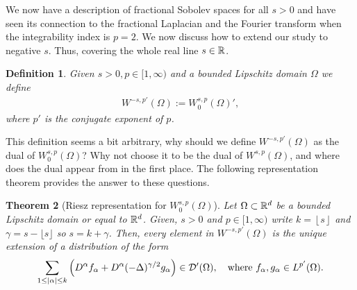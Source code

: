 \documentclass[12pt]{article}
\newtheorem{theorem}{Theorem}[section]
\newtheorem{definition}[theorem]{Definition}
\theoremstyle{definition}
\begin{document}
We now have a description of fractional Sobolev spaces for all $s>0$ and have seen its connection to the fractional Laplacian and the Fourier transform when the integrability index is $p=2$. We now discuss how to extend our study to negative $s$. Thus, covering the whole real line $s \in \mathbb{R}$.

\begin{definition}\label{dual definition}
  Given $s>0, p \in [1,\infty)$ and a bounded Lipschitz domain $\Omega $ we define
  \begin{align*}
    W^{-s,p'}(\Omega ):= W^{s,p}_0(\Omega )',
  \end{align*}
  where $p'$ is the conjugate exponent of $p$.
\end{definition}
This definition seems a bit arbitrary, why should we define $W^{-s,p'}(\Omega )$ as the dual of $W^{s,p}_0(\Omega )$? Why not choose it to be the dual of $W^{s,p}(\Omega )$, and where does the dual appear from in the first place. The following representation theorem provides the answer to these questions.
\begin{theorem}[Riesz representation for $W_0^{s,p}(\Omega )$]\label{riesz representation}
  Let $\Omega \subset \mathbb{R}^d$ be a bounded Lipschitz domain or equal to $\mathbb{R}^d$. Given,  $s>0$ and $p \in [1,\infty)$ write $k=\left\lfloor  s\right\rfloor$ and $\gamma = s- \lfloor s\rfloor$ so $s= k+\gamma $. Then,  every element in $W^{-s,p'}(\Omega )$ is the unique extension of a distribution  of the form
  \begin{align*}
    \sum_{1\leq\left| \alpha \right|\leq k}\left( D^\alpha f_\alpha+  D^\alpha (-\Delta )^{\gamma /2} g_\alpha\right)\in \mathcal{D}'(\Omega ),\quad \text{where }    f_\alpha, g_\alpha \in L^{p'}(\Omega ).
  \end{align*}

\end{theorem}
\end{document}
